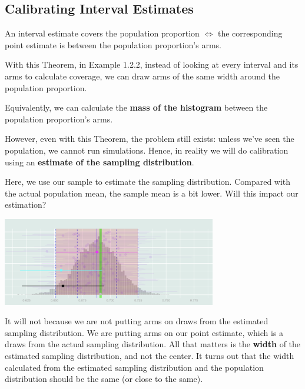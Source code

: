\subsection{Calibrating Interval Estimates}
\begin{thm}{}
	An interval estimate covers the population proportion $\iff$ the corresponding point estimate is between the population proportion's arms.	
\end{thm}

\begin{rmk}
	With this Theorem, in Example 1.2.2, instead of looking at every interval and its arms to calculate coverage, we can draw arms of the same width around the population proportion. \par Equivalently, we can calculate the \textbf{mass of the histogram} between the population proportion's arms. \par However, even with this Theorem, the problem still exists: unless we've seen the population, we cannot run simulations. Hence, in reality we will do calibration using an \textbf{estimate of the sampling distribution}.
\end{rmk}
\begin{eg}{}
	Here, we use our sample to estimate the sampling distribution. Compared with the actual population mean, the sample mean is a bit lower. Will this impact our estimation?
	\begin{center}\includegraphics[width=0.7\textwidth]{figs/EstimationOfDistribution.png}\end{center}
	\begin{sol}
		It will not because we are not putting arms on draws from the estimated sampling distribution. We are putting arms on our point estimate, which is a draws from the actual sampling distribution. All that matters is the \textbf{width} of the estimated sampling distribution, and not the center. It turns out that the width calculated from the estimated sampling distribution and the population distribution should be the same (or close to the same). 
	\end{sol}
\end{eg}
